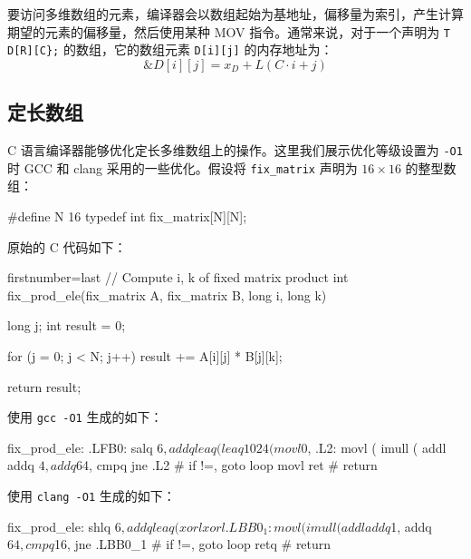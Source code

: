 要访问多维数组的元素，编译器会以数组起始为基地址，偏移量为索引，产生计算期望的元素的偏移量，然后使用某种 MOV 指令。通常来说，对于一个声明为 \verb|T D[R][C};| 的数组，它的数组元素 \verb|D[i][j]| 的内存地址为：
\begin{equation}
    \&D[i][j] = x_D + L(C \cdot i + j)
    \label{def:2darray_addr}
\end{equation}

\subsection{定长数组}

C 语言编译器能够优化定长多维数组上的操作。这里我们展示优化等级设置为 \verb|-O1| 时 GCC 和 clang 采用的一些优化。假设将 \verb|fix_matrix| 声明为 $16 \times 16$ 的整型数组：
\begin{cppcode}
#define N 16
typedef int fix_matrix[N][N];
\end{cppcode}

原始的 C 代码如下：
\begin{cppcode*}{firstnumber=last}
// Compute i, k of fixed matrix product
int fix_prod_ele(fix_matrix A, fix_matrix B, long i, long k) {
  long j;
  int result = 0;

  for (j = 0; j < N; j++)
    result += A[i][j] * B[j][k];

  return result;
}
\end{cppcode*}

使用 \verb|gcc -O1| 生成的如下：
\begin{gascode}
fix_prod_ele:
.LFB0:
    salq    $6, %
    addq    %
    leaq    (%
    leaq    1024(%
    movl    $0, %
.L2:
    movl    (%
    imull   (%
    addl    %
    addq    $4, %
    addq    $64, %
    cmpq    %
    jne     .L2                 # if !=, goto loop
    movl    %
    ret                         # return
\end{gascode}

使用 \verb|clang -O1| 生成的如下：
\begin{gascode}
fix_prod_ele:
    shlq    $6, %
    addq    %
    leaq    (%
    xorl    %
    xorl    %
.LBB0_1:
    movl    (%
    imull   (%
    addl    %
    addq    $1, %
    addq    $64, %
    cmpq    $16, %
    jne     .LBB0_1             # if !=, goto loop
    retq                        # return
\end{gascode}
\endinput
